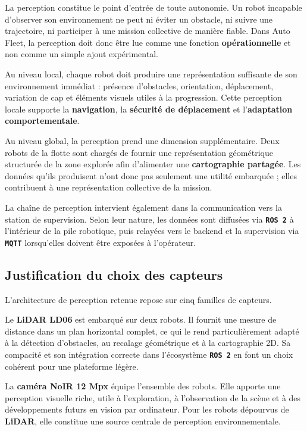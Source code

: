 \documentclass[11pt,a4paper]{report}
\newcommand{\kw}[1]{\textbf{#1}}
\newcommand{\outil}[1]{\textbf{\texttt{#1}}}
\begin{document}
La perception constitue le point d’entrée de toute autonomie. Un robot incapable d’observer son environnement ne peut ni éviter un obstacle, ni suivre une trajectoire, ni participer à une mission collective de manière fiable. Dans Auto Fleet, la perception doit donc être lue comme une fonction \kw{opérationnelle} et non comme un simple ajout expérimental.

Au niveau local, chaque robot doit produire une représentation suffisante de son environnement immédiat : présence d’obstacles, orientation, déplacement, variation de cap et éléments visuels utiles à la progression. Cette perception locale supporte la \kw{navigation}, la \kw{sécurité de déplacement} et l’\kw{adaptation comportementale}.

Au niveau global, la perception prend une dimension supplémentaire. Deux robots de la flotte sont chargés de fournir une représentation géométrique structurée de la zone explorée afin d’alimenter une \kw{cartographie partagée}. Les données qu’ils produisent n’ont donc pas seulement une utilité embarquée ; elles contribuent à une représentation collective de la mission.

La chaîne de perception intervient également dans la communication vers la station de supervision. Selon leur nature, les données sont diffusées via \outil{ROS 2} à l’intérieur de la pile robotique, puis relayées vers le backend et la supervision via \outil{MQTT} lorsqu’elles doivent être exposées à l’opérateur.

\subsection{Justification du choix des capteurs}

L’architecture de perception retenue repose sur cinq familles de capteurs.

Le \kw{LiDAR LD06} est embarqué sur deux robots. Il fournit une mesure de distance dans un plan horizontal complet, ce qui le rend particulièrement adapté à la détection d’obstacles, au recalage géométrique et à la cartographie 2D. Sa compacité et son intégration correcte dans l’écosystème \outil{ROS 2} en font un choix cohérent pour une plateforme légère.

La \kw{caméra NoIR 12 Mpx} équipe l’ensemble des robots. Elle apporte une perception visuelle riche, utile à l’exploration, à l’observation de la scène et à des développements futurs en vision par ordinateur. Pour les robots dépourvus de \kw{LiDAR}, elle constitue une source centrale de perception environnementale.
\end{document}
